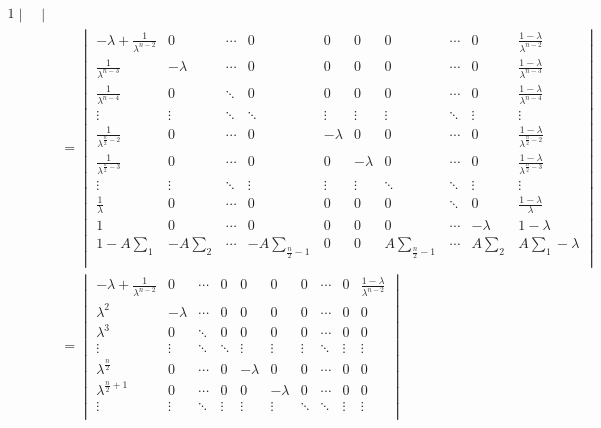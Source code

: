 \begin{alignat}{1}
\begin{vmatrix}
\end{vmatrix} \\
&=\begin{vmatrix} 
-\lambda + \frac{1}{\lambda^{n-2}}  & 0  & \cdots & 0 & 0 & 0 & 0 & \cdots & 0 &  \frac{1-\lambda}{\lambda^{n-2}}\\ 
\frac{1}{\lambda^{n-3}}  & -\lambda  & \cdots & 0 & 0 & 0 & 0 & \cdots & 0 &  \frac{1-\lambda}{\lambda^{n-3}} \\ 
\frac{1}{\lambda^{n-4}}  & 0  & \ddots & 0 & 0 & 0 & 0 & \cdots & 0 &  \frac{1-\lambda}{\lambda^{n-4}} \\  
\vdots & \vdots & \ddots & \ddots & \vdots & \vdots & \vdots & \ddots & \vdots & \vdots\\
\frac{1}{\lambda^{\frac{n}{2}-2}}  & 0  & \cdots & 0 & -\lambda & 0 & 0 & \cdots & 0 & \frac{1-\lambda}{\lambda^{\frac{n}{2}-2}}\\  
\frac{1}{\lambda^{\frac{n}{2}-3}}  & 0  & \cdots & 0 & 0 & -\lambda & 0 & \cdots & 0 & \frac{1-\lambda}{\lambda^{\frac{n}{2}-3}}\\  
\vdots & \vdots & \ddots & \vdots & \vdots & \vdots & \ddots & \ddots & \vdots & \vdots\\
 \frac{1}{\lambda}  & 0  & \cdots & 0 & 0 & 0 & 0 & \ddots & 0 &  \frac{1-\lambda}{\lambda}\\ 
1 & 0 & \cdots &  0 & 0 & 0 & 0 & \cdots & -\lambda & 1-\lambda \\  
1-A\sum\limits_{1} & -A\sum\limits_{2} & \cdots &  -A\sum\limits_{\frac{n}{2}-1} & 0 & 0 &  A\sum\limits_{\frac{n}{2}-1}& \cdots & A\sum\limits_{2} & A\sum\limits_{1}-\lambda \\ 
\end{vmatrix} \\
&=\begin{vmatrix} 
-\lambda + \frac{1}{\lambda^{n-2}}  & 0  & \cdots & 0 & 0 & 0 & 0 & \cdots & 0 &  \frac{1-\lambda}{\lambda^{n-2}}\\ 
\lambda^{2} & -\lambda  & \cdots & 0 & 0 & 0 & 0 & \cdots & 0 &  0 \\ 
\lambda^{3} & 0  & \ddots & 0 & 0 & 0 & 0 & \cdots & 0 &  0 \\  
\vdots & \vdots & \ddots & \ddots & \vdots & \vdots & \vdots & \ddots & \vdots & \vdots\\
\lambda^{\frac{n}{2}}  & 0  & \cdots & 0 & -\lambda & 0 & 0 & \cdots & 0 & 0 \\  
\lambda^{\frac{n}{2}+1}  & 0  & \cdots & 0 & 0 & -\lambda & 0 & \cdots & 0 & 0 \\  
\vdots & \vdots & \ddots & \vdots & \vdots & \vdots & \ddots & \ddots & \vdots & \vdots\\

\end{vmatrix}
\end{alignat}
